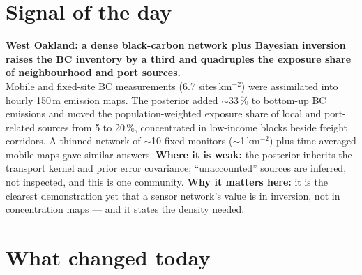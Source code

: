 \documentclass[10pt]{article}
\begin{document}
\vspace{6mm}

\section*{\sffamily\bfseries\color{Deep}Signal of the day}
\vspace{-1.5mm}{\color{Amber}\rule{\linewidth}{1.1pt}}\vspace{2.5mm}

\begin{keybox}
{\sffamily\bfseries\small\color{Deep}West Oakland: a dense black-carbon network plus Bayesian inversion
raises the BC inventory by a third and quadruples the exposure share of neighbourhood and port sources.}\\[1.4mm]
\footnotesize
Mobile and fixed-site BC measurements (6.7 sites\,km$^{-2}$) were assimilated into hourly 150\,m emission maps. The
posterior added $\sim$33\,\% to bottom-up BC emissions and moved the population-weighted exposure share of local and
port-related sources from 5 to 20\,\%, concentrated in low-income blocks beside freight corridors. A thinned network of
$\sim$10 fixed monitors ($\sim$1\,km$^{-2}$) plus time-averaged mobile maps gave similar answers.
\textbf{Where it is weak:} the posterior inherits the transport kernel and prior error covariance; ``unaccounted''
sources are inferred, not inspected, and this is one community.
\textbf{Why it matters here:} it is the clearest demonstration yet that a sensor network's value is in inversion, not
in concentration maps --- and it states the density needed.\par
\end{keybox}

\vspace{3mm}

\section*{\sffamily\bfseries\color{Deep}What changed today}
\vspace{-1.5mm}{\color{Amber}\rule{\linewidth}{1.1pt}}\vspace{2.5mm}
\end{document}
